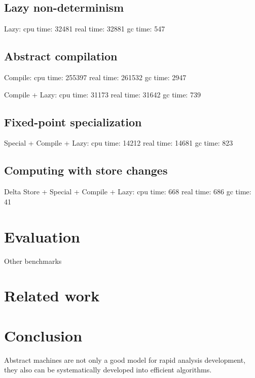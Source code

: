 \documentclass{llncs}
\begin{document}
\subsection{Lazy non-determinism}

Lazy:
   cpu time: 32481 real time: 32881 gc time: 547

\subsection{Abstract compilation}

Compile:
   cpu time: 255397 real time: 261532 gc time: 2947

\noindent
Compile + Lazy:
   cpu time: 31173 real time: 31642 gc time: 739

\subsection{Fixed-point specialization}


Special + Compile + Lazy:
   cpu time: 14212 real time: 14681 gc time: 823

\subsection{Computing with store changes}

Delta Store + Special + Compile + Lazy:
   cpu time: 668 real time: 686 gc time: 41

\section{Evaluation}

Other benchmarks

\section{Related work}

\section{Conclusion}

Abstract machines are not only a good model for rapid analysis
development, they also can be systematically developed into efficient
algorithms.
\end{document}
